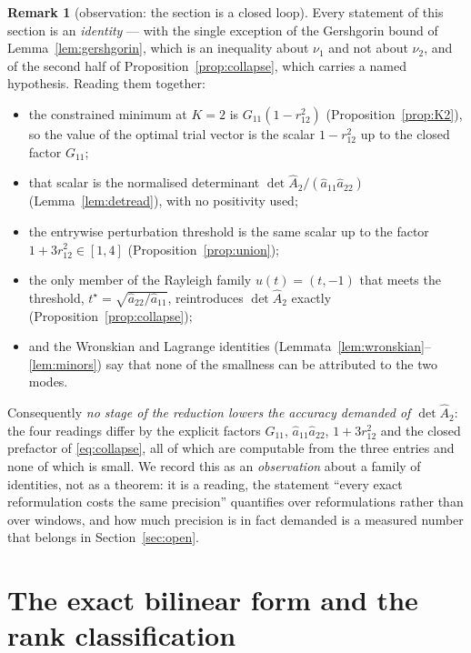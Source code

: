 \documentclass[11pt,a4paper]{article}
\theoremstyle{plain}
\theoremstyle{definition}
\newtheorem{remark}[theorem]{Remark}
\newcommand{\Ah}{\widehat{A}}
\newcommand{\ah}{\widehat{a}}
\begin{document}
\begin{remark}[observation: the section is a closed loop]
\label{rem:selfsimilar}
Every statement of this section is an \emph{identity} --- with the single
exception of the Gershgorin bound of Lemma~\ref{lem:gershgorin}, which is an
inequality about $\nu_1$ and not about $\nu_2$, and of the second half of
Proposition~\ref{prop:collapse}, which carries a named hypothesis. Reading them
together:
\begin{itemize}
\item the constrained minimum at $K=2$ is $G_{11}(1-r_{12}^{2})$
  (Proposition~\ref{prop:K2}), so the value of the optimal trial vector is the
  scalar $1-r_{12}^{2}$ up to the closed factor $G_{11}$;
\item that scalar is the normalised determinant
  $\det\Ah_2/(\ah_{11}\ah_{22})$ (Lemma~\ref{lem:detread}), with no positivity
  used;
\item the entrywise perturbation threshold is the same scalar up to the factor
  $1+3r_{12}^{2}\in[1,4]$ (Proposition~\ref{prop:union});
\item the only member of the Rayleigh family $u(t)=(t,-1)$ that meets the
  threshold, $t^{\star}=\sqrt{\ah_{22}/\ah_{11}}$, reintroduces
  $\det\Ah_2$ exactly (Proposition~\ref{prop:collapse});
\item and the Wronskian and Lagrange identities
  (Lemmata~\ref{lem:wronskian}--\ref{lem:minors}) say that none of the
  smallness can be attributed to the two modes.
\end{itemize}
Consequently \emph{no stage of the reduction lowers the accuracy demanded of
$\det\Ah_2$}: the four readings differ by the explicit factors $G_{11}$,
$\ah_{11}\ah_{22}$, $1+3r_{12}^{2}$ and the closed prefactor of
\eqref{eq:collapse}, all of which are computable from the three entries and
none of which is small. We record this as an \emph{observation} about a family
of identities, not as a theorem: it is a reading, the statement ``every exact
reformulation costs the same precision'' quantifies over reformulations rather
than over windows, and how much precision is in fact demanded is a measured
number that belongs in Section~\ref{sec:open}.
\end{remark}

\section{The exact bilinear form and the rank classification}
\label{sec:rank}
\end{document}
